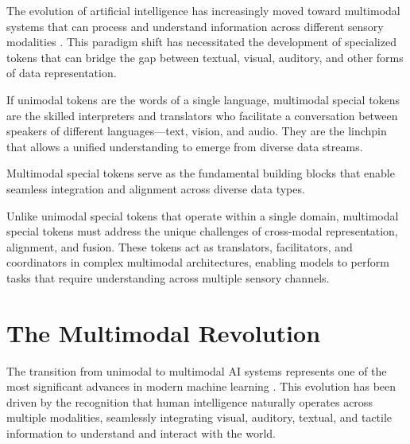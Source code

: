 
The evolution of artificial intelligence has increasingly moved toward multimodal systems that can process and understand information across different sensory modalities \citep{girdhar2023imagebind, reed2022generalist}. This paradigm shift has necessitated the development of specialized tokens that can bridge the gap between textual, visual, auditory, and other forms of data representation.

If unimodal tokens are the words of a single language, multimodal special tokens are the skilled interpreters and translators who facilitate a conversation between speakers of different languages—text, vision, and audio. They are the linchpin that allows a unified understanding to emerge from diverse data streams.

Multimodal special tokens serve as the fundamental building blocks that enable seamless integration and alignment across diverse data types.

\begin{comment}
Feedback: This is a strong opening. To make it even more engaging, you could use a metaphor to explain the role of these tokens. For example: "If unimodal tokens are the words of a single language, multimodal special tokens are the skilled interpreters and translators who facilitate a conversation between speakers of different languages—text, vision, and audio. They are the linchpin that allows a unified understanding to emerge from diverse data streams."

STATUS: addressed - added interpreter/translator metaphor to make the role of multimodal tokens more engaging
\end{comment}

Unlike unimodal special tokens that operate within a single domain, multimodal special tokens must address the unique challenges of cross-modal representation, alignment, and fusion. These tokens act as translators, facilitators, and coordinators in complex multimodal architectures, enabling models to perform tasks that require understanding across multiple sensory channels.

\section{The Multimodal Revolution}

The transition from unimodal to multimodal AI systems represents one of the most significant advances in modern machine learning \citep{radford2021learning, wang2022ofa}. This evolution has been driven by the recognition that human intelligence naturally operates across multiple modalities, seamlessly integrating visual, auditory, textual, and tactile information to understand and interact with the world.

